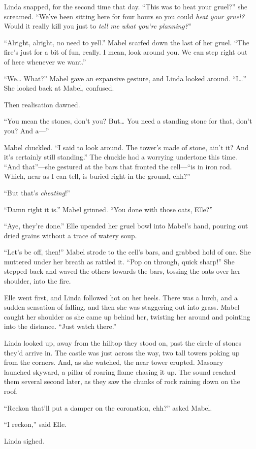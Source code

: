 Linda snapped, for the second time that day.
``This was to heat your gruel?'' she screamed.
``We've been sitting here for four hours so you could \emph{heat your gruel?}
Would it really kill you just to \emph{tell me what you're planning?}''

``Alright, alright, no need to yell.''
Mabel scarfed down the last of her gruel.
``The fire's just for a bit of fun, really.
I mean, look around you.
We can step right out of here whenever we want.''

``We{\dots}
What?''
Mabel gave an expansive gesture, and Linda looked around.
``I{\dots}''
She looked back at Mabel, confused.


Then realisation dawned.

``You mean the stones, don't you?
But{\dots}
You need a standing stone for that, don't you?
And a---''

Mabel chuckled.
``I said to look around.
The tower's made of stone, ain't it?
And it's certainly still standing.''
The chuckle had a worrying undertone this time.
``And that''---she gestured at the bars that fronted the cell---``is in iron rod.
Which, near as I can tell, is buried right in the ground, ehh?''

``But that's \emph{cheating}!''

``Damn right it is.''
Mabel grinned.
``You done with those oats, Elle?''

``Aye, they're done.''
Elle upended her gruel bowl into Mabel's hand, pouring out dried grains without a trace of watery soup.

``Let's be off, then!''
Mabel strode to the cell's bars, and grabbed hold of one.
She muttered under her breath as rattled it.
``Pop on through, quick sharp!''
She stepped back and waved the others towards the bars, tossing the oats over her shoulder, into the fire.

Elle went first, and Linda followed hot on her heels.
There was a lurch, and a sudden sensation of falling, and then she was staggering out into grass.
Mabel caught her shoulder as she came up behind her, twisting her around and pointing into the distance.
``Just watch there.''

Linda looked up, away from the hilltop they stood on, past the circle of stones they'd arrive in.
The castle was just across the way, two tall towers poking up from the corners.
And, as she watched, the near tower erupted.
Masonry launched skyward, a pillar of roaring flame chasing it up.
The sound reached them several second later, as they saw the chunks of rock raining down on the roof.

``Reckon that'll put a damper on the coronation, ehh?'' asked Mabel.

``I reckon,'' said Elle.

Linda sighed.
